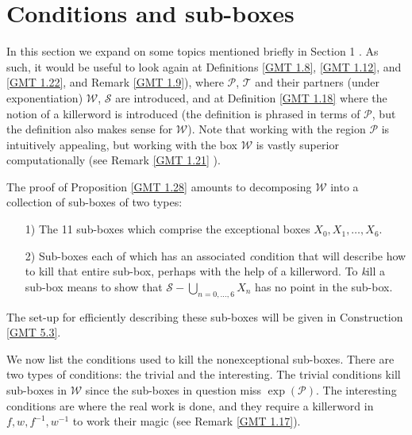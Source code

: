  
\chapter{Conditions and sub-boxes}
  
In this section we expand on some topics mentioned briefly in
Section 1 %
.  As such, it would be useful to look again at
Definitions \ref{GMT 1.8}, \ref{GMT 1.12}, and \ref{GMT 1.22}, and Remark \ref{GMT 1.9}),
where ${\mathcal P}$, ${\mathcal T}$ and their partners (under exponentiation)
${\mathcal W}$, ${\mathcal S}$ are introduced, and at
Definition \ref{GMT 1.18}
 where the notion of a killerword is introduced (the
definition is phrased in terms of ${\mathcal P}$, but the definition also makes sense for ${\mathcal W}$).  Note that working with
the region
${\mathcal P}$ is intuitively appealing, but working with the box ${\mathcal W}$ is vastly superior computationally (see
Remark \ref{GMT 1.21}
).

The proof of Proposition \ref{GMT 1.28} amounts to decomposing
 ${\mathcal W}$ into a collection of sub-boxes of two types:
\begin{itemize}
\item[1)]   The 11 sub-boxes which comprise the 
exceptional boxes $X_0, X_1, \ldots, X_6.$ 

\item[2)]   Sub-boxes each of which has an associated {\textit condition} that will describe how to kill that entire sub-box,
perhaps with the help of a killerword.  To {\textit kill} a sub-box means to show that 
${\mathcal S} - \bigcup_{n = 0,\dots, 6} X_n$ has no point in the sub-box. 
\end{itemize}
\noindent The set-up for efficiently describing these sub-boxes will be given in Construction \ref{GMT 5.3}. 
 

We now list the conditions used to kill the nonexceptional sub-boxes.  There are two types of conditions: the trivial and
the interesting.  The trivial conditions kill sub-boxes in ${\mathcal W}$ since the sub-boxes in question miss 
$\exp({\mathcal P}).$  The interesting conditions are where the real work is done, and they require a killerword in $f, w,
f^{-1}, w^{-1}$ to work their magic (see
Remark \ref{GMT 1.17}).

